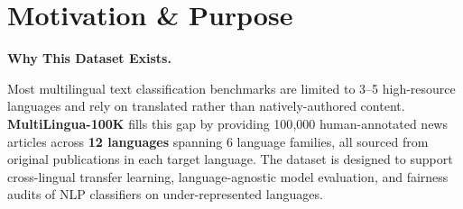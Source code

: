 \section{Motivation \& Purpose}

\begin{motivationbox}
  \textbf{\textcolor{accent}{\faBullseye}\quad Why This Dataset Exists.}
  \smallskip

  Most multilingual text classification benchmarks are limited to 3--5 high-resource
  languages and rely on translated rather than natively-authored content.
  \textbf{MultiLingua-100K} fills this gap by providing 100{,}000 human-annotated news
  articles across \textbf{12 languages} spanning 6 language families, all sourced from
  original publications in each target language. The dataset is designed to support
  cross-lingual transfer learning, language-agnostic model evaluation, and fairness
  audits of NLP classifiers on under-represented languages.
\end{motivationbox}

